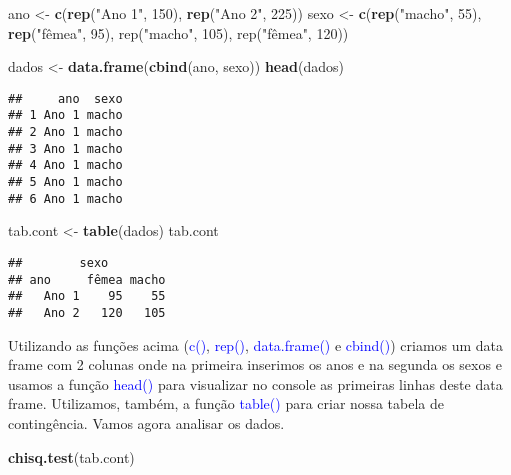 \documentclass[14pt,titlepage, oneside, openany, a4paper]{book}
\newenvironment{Shaded}{\begin{snugshade}}{\end{snugshade}}
\newcommand{\DecValTok}[1]{\textcolor[rgb]{0.00,0.00,0.81}{#1}}
\newcommand{\KeywordTok}[1]{\textcolor[rgb]{0.13,0.29,0.53}{\textbf{#1}}}
\newcommand{\NormalTok}[1]{#1}
\newcommand{\StringTok}[1]{\textcolor[rgb]{0.31,0.60,0.02}{#1}}
\begin{document}
\begin{Shaded}
\begin{Highlighting}[]
\NormalTok{ano <-}\StringTok{ }\KeywordTok{c}\NormalTok{(}\KeywordTok{rep}\NormalTok{(}\StringTok{"Ano 1"}\NormalTok{, }\DecValTok{150}\NormalTok{), }\KeywordTok{rep}\NormalTok{(}\StringTok{"Ano 2"}\NormalTok{, }\DecValTok{225}\NormalTok{))}
\NormalTok{sexo <-}\StringTok{ }\KeywordTok{c}\NormalTok{(}\KeywordTok{rep}\NormalTok{(}\StringTok{"macho"}\NormalTok{, }\DecValTok{55}\NormalTok{), }\KeywordTok{rep}\NormalTok{(}\StringTok{"fêmea", 95), rep("}\NormalTok{macho}\StringTok{", 105), rep("}\NormalTok{fêmea", }\DecValTok{120}\NormalTok{))}

\NormalTok{dados <-}\StringTok{ }\KeywordTok{data.frame}\NormalTok{(}\KeywordTok{cbind}\NormalTok{(ano, sexo))}
\KeywordTok{head}\NormalTok{(dados)}
\end{Highlighting}
\end{Shaded}

\begin{verbatim}
##     ano  sexo
## 1 Ano 1 macho
## 2 Ano 1 macho
## 3 Ano 1 macho
## 4 Ano 1 macho
## 5 Ano 1 macho
## 6 Ano 1 macho
\end{verbatim}

\begin{Shaded}
\begin{Highlighting}[]
\NormalTok{tab.cont <-}\StringTok{ }\KeywordTok{table}\NormalTok{(dados)}
\NormalTok{tab.cont}
\end{Highlighting}
\end{Shaded}

\begin{verbatim}
##        sexo
## ano     fêmea macho
##   Ano 1    95    55
##   Ano 2   120   105
\end{verbatim}

Utilizando as funções acima (\textcolor{blue}{c()}, \textcolor{blue}{rep()}, \textcolor{blue}{data.frame()} e \textcolor{blue}{cbind()}) criamos um data frame com 2 colunas onde na primeira inserimos os anos e na segunda os sexos e usamos a função \textcolor{blue}{head()} para visualizar no console as primeiras linhas deste data frame. Utilizamos, também, a função \textcolor{blue}{table()} para criar nossa tabela de contingência. Vamos agora analisar os dados.

\begin{Shaded}
\begin{Highlighting}[]
\KeywordTok{chisq.test}\NormalTok{(tab.cont)}
\end{Highlighting}
\end{Shaded}
\end{document}
